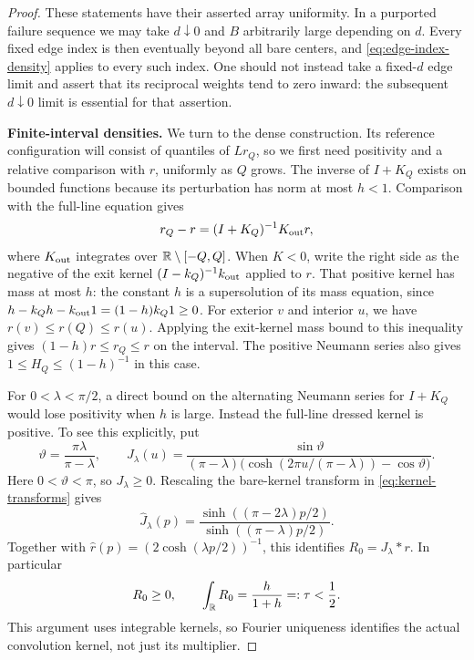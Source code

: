 \begin{proof}
These statements have their asserted array uniformity.  In a
purported failure sequence we may take $d\downarrow0$ and $B$
arbitrarily large depending on $d$.  Every fixed edge index is then
eventually beyond all bare centers, and
\eqref{eq:edge-index-density} applies to every such index.
One should not instead take a fixed-$d$ edge limit and assert that
its reciprocal weights tend to zero inward: the subsequent
$d\downarrow0$ limit is essential for that assertion.

\smallskip\noindent\textbf{Finite-interval densities.}
We turn to the dense construction. Its reference configuration will
consist of quantiles of $Lr_Q$, so we first need positivity and a
relative comparison with $r$, uniformly as $Q$ grows. The inverse of
$I+K_Q$ exists on bounded functions because its perturbation has norm
at most $h<1$.
Comparison with the full-line equation gives
\begin{equation}\label{eq:finite-Q-correction}
 r_Q-r=(I+K_Q)^{-1}K_{\rm out}r,
\end{equation}
where $K_{\rm out}$ integrates over $\mathbb R\setminus[-Q,Q]$.
When $K<0$, write the right side as the negative of the exit kernel
$(I-k_Q)^{-1}k_{\rm out}$ applied to $r$.
That positive kernel has mass at most $h$: the constant $h$ is a
supersolution of its mass equation, since
$h-k_Qh-k_{\rm out}1=(1-h)k_Q1\ge0$.
For exterior $v$ and interior $u$, we have
$r(v)\le r(Q)\le r(u)$. Applying the exit-kernel mass bound to
this inequality gives $(1-h)r\le r_Q\le r$ on the interval.  The positive Neumann
series also gives $1\le H_Q\le(1-h)^{-1}$ in this case.

For $0<\lambda<\pi/2$, a direct bound on the alternating Neumann
series for $I+K_Q$ would lose positivity when $h$ is large.
Instead the full-line dressed kernel is positive.  To see this
explicitly, put
\[
 \vartheta=\frac{\pi\lambda}{\pi-\lambda},\qquad
 J_\lambda(u)=
 \frac{\sin\vartheta}
 {(\pi-\lambda)
   \bigl(\cosh(2\pi u/(\pi-\lambda))-\cos\vartheta\bigr)}.
\]
Here $0<\vartheta<\pi$, so $J_\lambda\ge0$.
Rescaling the bare-kernel transform in
\eqref{eq:kernel-transforms} gives
\[
 \widehat J_\lambda(p)
   =\frac{\sinh((\pi-2\lambda)p/2)}
          {\sinh((\pi-\lambda)p/2)}.
\]
Together with $\widehat r(p)=(2\cosh(\lambda p/2))^{-1}$,
this identifies $R_0=J_\lambda*r$.  In particular
\begin{equation}\label{eq:positive-dressed-resolvent}
 R_0\ge0,\qquad
 \int_\mathbb R R_0=\frac{h}{1+h}=:\tau<\frac12.
\end{equation}
This argument uses integrable kernels, so Fourier uniqueness
identifies the actual convolution kernel, not just its multiplier.


\end{proof}
